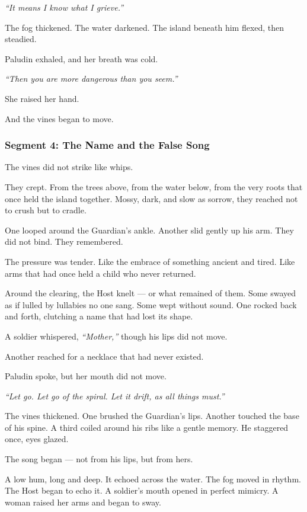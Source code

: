 \documentclass[9pt]{article}
\begin{document}
\textit{``It means I know what I grieve.''}

The fog thickened. The water darkened. The island beneath him flexed, then steadied.

Paludin exhaled, and her breath was cold.

\textit{``Then you are more dangerous than you seem.''}

She raised her hand.

And the vines began to move.

\newpage

\subsubsection*{Segment 4: The Name and the False Song}

The vines did not strike like whips.

They crept. From the trees above, from the water below, from the very roots that once held the island together. Mossy, dark, and slow as sorrow, they reached not to crush but to cradle.

One looped around the Guardian’s ankle. Another slid gently up his arm. They did not bind. They remembered.

The pressure was tender. Like the embrace of something ancient and tired. Like arms that had once held a child who never returned.

Around the clearing, the Host knelt — or what remained of them. Some swayed as if lulled by lullabies no one sang. Some wept without sound. One rocked back and forth, clutching a name that had lost its shape.

A soldier whispered, \textit{“Mother,”} though his lips did not move.

Another reached for a necklace that had never existed.

Paludin spoke, but her mouth did not move.

\textit{``Let go. Let go of the spiral. Let it drift, as all things must.''}

The vines thickened. One brushed the Guardian’s lips. Another touched the base of his spine. A third coiled around his ribs like a gentle memory. He staggered once, eyes glazed.

The song began — not from his lips, but from hers.

A low hum, long and deep. It echoed across the water. The fog moved in rhythm. The Host began to echo it. A soldier’s mouth opened in perfect mimicry. A woman raised her arms and began to sway.
\end{document}
